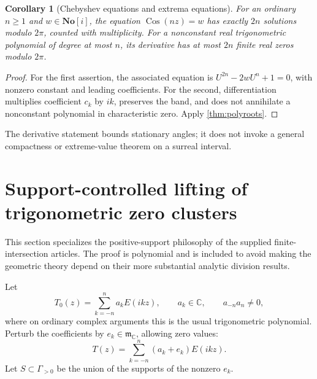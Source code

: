 \documentclass[11pt]{article}
\numberwithin{equation}{section}
\newtheorem{corollary}[theorem]{Corollary}
\theoremstyle{definition}
\newcommand{\SC}{\mathbf{No}[i]}
\newcommand{\C}{\mathbb C}
\newcommand{\mm}{\mathfrak m}
\newcommand{\Cos}{\operatorname{Cos}}
\begin{document}
\begin{corollary}[Chebyshev equations and extrema equations]
For an ordinary $n\ge1$ and $w\in\SC$, the equation $\Cos(nz)=w$ has exactly $2n$ solutions modulo $2\pi$, counted with multiplicity. For a nonconstant real trigonometric polynomial of degree at most $n$, its derivative has at most $2n$ finite real zeros modulo $2\pi$.
\end{corollary}
\begin{proof}
For the first assertion, the associated equation is $U^{2n}-2wU^n+1=0$, with nonzero constant and leading coefficients. For the second, differentiation multiplies coefficient $c_k$ by $ik$, preserves the band, and does not annihilate a nonconstant polynomial in characteristic zero. Apply \cref{thm:polyroots}.
\end{proof}
The derivative statement bounds stationary angles; it does not invoke a general compactness or extreme-value theorem on a surreal interval.

\section{Support-controlled lifting of trigonometric zero clusters}\label{sec:clusters}
This section specializes the positive-support philosophy of the supplied finite-intersection articles. The proof is polynomial and is included to avoid making the geometric theory depend on their more substantial analytic division results.

Let
\[
 T_0(z)=\sum_{k=-n}^{n}a_kE(ikz),\qquad a_k\in\C,
 \qquad a_{-n}a_n\ne0,
\]
where on ordinary complex arguments this is the usual trigonometric polynomial. Perturb the coefficients by $e_k\in\mm_{\C}$, allowing zero values:
\[
 T(z)=\sum_{k=-n}^{n}(a_k+e_k)E(ikz).
\]
Let $S\subset\Gamma_{>0}$ be the union of the supports of the nonzero $e_k$.
\end{document}
